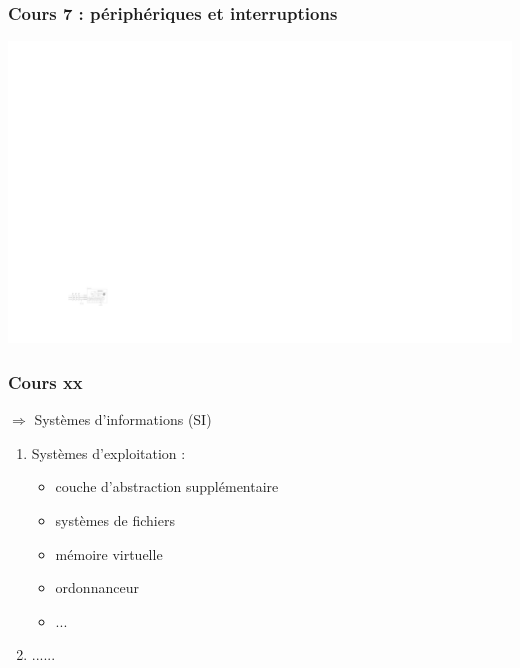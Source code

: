 \documentclass{beamer}
\begin{document}
\begin{frame}
\frametitle{Cours 7 : périphériques et interruptions}

\includegraphics[width=\linewidth]{Figs/chemin_peripherique.pdf}

\end{frame}

\begin{frame}
\frametitle{Cours xx}
$\Rightarrow$ Systèmes d'informations (SI)
\begin{enumerate}
\item Systèmes d'exploitation :
\begin{itemize}
\item couche d'abstraction supplémentaire
\item systèmes de fichiers
\item mémoire virtuelle
\item ordonnanceur
\item ...
\end{itemize}
\item ......
\end{enumerate}
\end{frame}

\end{document}
